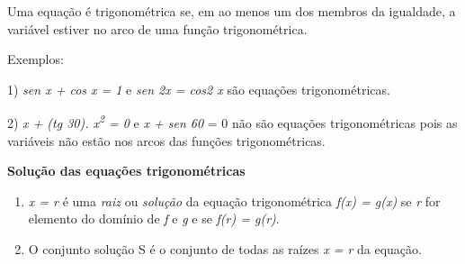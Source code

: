 \begin{caixa}
\begin{tdefinicao}
Uma equação é trigonométrica se, em ao menos um dos membros da igualdade, a variável estiver no arco de uma função trigonométrica.

Exemplos:

1) \textit{sen x + cos x = 1} e \textit{sen 2x = cos2 x} são equações trigonométricas.

2) \textit{x + (tg 30\degree). x\textsuperscript{2} = 0} e \textit{x + sen 60\degree} = 0  não são equações trigonométricas pois as variáveis não estão nos arcos das funções trigonométricas.
\end{tdefinicao}
\end{caixa}

\textbf{Solução das equações trigonométricas}

\begin{caixa}
\begin{enumerate}
    \item  \textit{x = r}  é uma \textit{raiz} ou \textit{solução} da equação trigonométrica \textit{f(x) = g(x)} se \textit{r} for elemento do domínio de \textit{f }e\textit{ g} e se \textit{f(r) = g(r)}.

    \item O conjunto solução S é o conjunto de todas as raízes  \textit{x = r}  da equação.
\end{enumerate}
\end{caixa}

